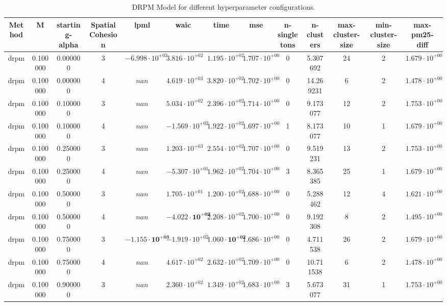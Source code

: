 \begin{table}
\caption{DRPM Model for different hyperparameter configurations.}
\begin{tabular}{ccccccccccccc}
\toprule
Method & M & starting-alpha & SpatialCohesion & lpml & waic & time & mse & n-singletons & n-clusters & max-cluster-size & min-cluster-size & max-pm25-diff \\
\midrule
drpm & 0.100000 & 0.000000 & 3 & $-6.998 \cdot 10^{+03}$ & $3.816 \cdot 10^{+02}$ & $1.195 \cdot 10^{+02}$ & $1.707 \cdot 10^{+00}$ & 0 & 5.307692 & 24 & 2 & $1.679 \cdot 10^{+00}$ \\
drpm & 0.100000 & 0.000000 & 4 & $nan$ & $4.619 \cdot 10^{+03}$ & $3.820 \cdot 10^{+02}$ & $1.702 \cdot 10^{+00}$ & 0 & 14.269231 & 6 & 2 & $1.478 \cdot 10^{+00}$ \\
drpm & 0.100000 & 0.100000 & 3 & $nan$ & $5.034 \cdot 10^{+02}$ & $2.396 \cdot 10^{+02}$ & $1.714 \cdot 10^{+00}$ & 0 & 9.173077 & 12 & 2 & $1.753 \cdot 10^{+00}$ \\
drpm & 0.100000 & 0.100000 & 4 & $nan$ & $-1.569 \cdot 10^{+02}$ & $1.922 \cdot 10^{+02}$ & $1.697 \cdot 10^{+00}$ & 1 & 8.173077 & 10 & 1 & $1.679 \cdot 10^{+00}$ \\
drpm & 0.100000 & 0.250000 & 3 & $nan$ & $1.203 \cdot 10^{+03}$ & $2.554 \cdot 10^{+02}$ & $1.707 \cdot 10^{+00}$ & 0 & 9.519231 & 13 & 2 & $1.753 \cdot 10^{+00}$ \\
drpm & 0.100000 & 0.250000 & 4 & $nan$ & $-5.307 \cdot 10^{+01}$ & $1.962 \cdot 10^{+02}$ & $1.704 \cdot 10^{+00}$ & 3 & 8.365385 & 25 & 1 & $1.679 \cdot 10^{+00}$ \\
drpm & 0.100000 & 0.500000 & 3 & $nan$ & $1.705 \cdot 10^{+01}$ & $1.200 \cdot 10^{+02}$ & $1.688 \cdot 10^{+00}$ & 0 & 5.288462 & 12 & 4 & $1.621 \cdot 10^{+00}$ \\
drpm & 0.100000 & 0.500000 & 4 & $nan$ & $\mathbf{-4.022 \cdot 10^{+02}}$ & $2.208 \cdot 10^{+02}$ & $1.700 \cdot 10^{+00}$ & 0 & 9.192308 & 8 & 2 & $1.495 \cdot 10^{+00}$ \\
drpm & 0.100000 & 0.750000 & 3 & $\mathbf{-1.155 \cdot 10^{+03}}$ & $-1.919 \cdot 10^{+02}$ & $\mathbf{1.060 \cdot 10^{+02}}$ & $1.686 \cdot 10^{+00}$ & 0 & 4.711538 & 26 & 2 & $1.679 \cdot 10^{+00}$ \\
drpm & 0.100000 & 0.750000 & 4 & $nan$ & $4.617 \cdot 10^{+02}$ & $2.632 \cdot 10^{+02}$ & $1.709 \cdot 10^{+00}$ & 0 & 10.711538 & 6 & 2 & $1.478 \cdot 10^{+00}$ \\
drpm & 0.100000 & 0.900000 & 3 & $nan$ & $2.360 \cdot 10^{+02}$ & $1.349 \cdot 10^{+02}$ & $1.683 \cdot 10^{+00}$ & 3 & 5.673077 & 31 & 1 & $1.753 \cdot 10^{+00}$ \\

\end{tabular}
\end{table}
